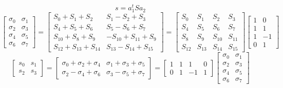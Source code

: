 \documentclass{article}%
\begin{document}
\[%
s = a_1^t S a_2%
\]%
\[%
\left[\begin{matrix}\sigma_{0} & \sigma_{1}\\\sigma_{2} & \sigma_{3}\\\sigma_{4} & \sigma_{5}\\\sigma_{6} & \sigma_{7}\end{matrix}\right] = \left[\begin{matrix}S_{0} + S_{1} + S_{2} & S_{1} - S_{2} + S_{3}\\S_{4} + S_{5} + S_{6} & S_{5} - S_{6} + S_{7}\\S_{10} + S_{8} + S_{9} & - S_{10} + S_{11} + S_{9}\\S_{12} + S_{13} + S_{14} & S_{13} - S_{14} + S_{15}\end{matrix}\right] = \left[\begin{matrix}S_{0} & S_{1} & S_{2} & S_{3}\\S_{4} & S_{5} & S_{6} & S_{7}\\S_{8} & S_{9} & S_{10} & S_{11}\\S_{12} & S_{13} & S_{14} & S_{15}\end{matrix}\right] \left[\begin{matrix}1 & 0\\1 & 1\\1 & -1\\0 & 1\end{matrix}\right]%
\]%
\[%
\left[\begin{matrix}s_{0} & s_{1}\\s_{2} & s_{3}\end{matrix}\right] = \left[\begin{matrix}\sigma_{0} + \sigma_{2} + \sigma_{4} & \sigma_{1} + \sigma_{3} + \sigma_{5}\\\sigma_{2} - \sigma_{4} + \sigma_{6} & \sigma_{3} - \sigma_{5} + \sigma_{7}\end{matrix}\right] = \left[\begin{matrix}1 & 1 & 1 & 0\\0 & 1 & -1 & 1\end{matrix}\right] \left[\begin{matrix}\sigma_{0} & \sigma_{1}\\\sigma_{2} & \sigma_{3}\\\sigma_{4} & \sigma_{5}\\\sigma_{6} & \sigma_{7}\end{matrix}\right]%
\]%
\end{document}

